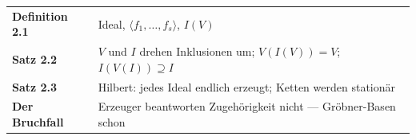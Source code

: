 \begin{merksatz}
\begin{center}
\renewcommand{\arraystretch}{1.5}
\begin{tabular}{@{}P{3.0cm}P{5.6cm}@{}}
\toprule
\textbf{Definition 2.1} & Ideal, $\langle f_1, \ldots, f_s\rangle$, $I(V)$\\
\textbf{Satz 2.2} & $V$ und $I$ drehen Inklusionen um; $V(I(V)) = V$; $I(V(I))\supseteq I$\\
\textbf{Satz 2.3} & Hilbert: jedes Ideal endlich erzeugt; Ketten werden stationär\\
\textbf{Der Bruchfall} & Erzeuger beantworten Zugehörigkeit nicht --- Gröbner-Basen schon\\
\bottomrule
\end{tabular}
\end{center}

\begin{center}
\begin{minipage}{0.88\textwidth}
\end{minipage}
\end{center}
\end{merksatz}
